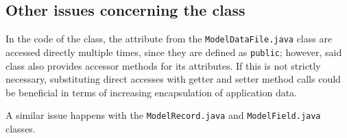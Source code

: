 \subsection{Other issues concerning the class}
In the code of the class, the attribute from the \texttt{ModelDataFile.java} class are accessed directly multiple times, since they are defined as \texttt{public}; however, said class also provides accessor methods for its attributes. If this is not strictly necessary, substituting direct accesses with getter and setter method calls could be beneficial in terms of increasing encapsulation of application data.

A similar issue happens with the \texttt{ModelRecord.java} and \texttt{ModelField.java} classes.